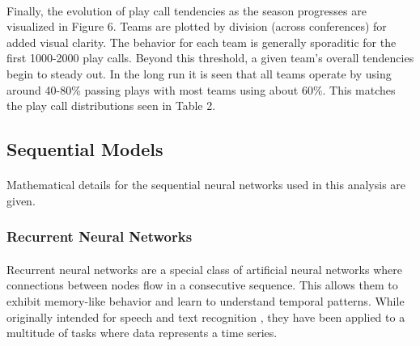 \documentclass[11pt]{article}
\begin{document}
                    \begin{multicols*}{2}

                \paragraph{}
                    Finally, the evolution of play call tendencies as the season progresses are visualized in Figure 6. 
                    Teams are plotted by division (across conferences) for added visual clarity.
                    The behavior for each team is generally sporaditic for the first 1000-2000 play calls. 
                    Beyond this threshold, a given team's overall tendencies begin to steady out. 
                    In the long run it is seen that all teams operate by using around 40-80\% passing plays with most teams using about 60\%. 
                    This matches the play call distributions seen in Table 2.
                    
        
        \subsection{Sequential Models}
            \paragraph{}
                Mathematical details for the sequential neural networks used in this analysis are given. 

            \vspace{-5pt}

            \subsubsection*{Recurrent Neural Networks}
                \paragraph{}
                    Recurrent neural networks are a special class of artificial neural networks where connections between nodes flow in a consecutive sequence. 
                    This allows them to exhibit memory-like behavior and learn to understand temporal patterns. 
                    While originally intended for speech and text recognition \cite{Li15}, they have been applied to a multitude of tasks where data represents a time series.
                
                \vspace{-10pt}


\end{multicols*}
\end{document}
